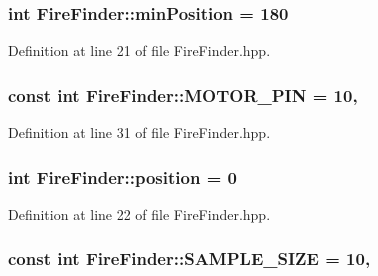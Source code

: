 \hypertarget{classFireFinder_ad8be0837d88f10d65b6f8a405f29494a}{
\subsubsection[{min\-Position}]{\setlength{\rightskip}{0pt plus 5cm}int Fire\-Finder\-::min\-Position = 180\hspace{0.3cm}{\ttfamily [private]}}}\label{classFireFinder_ad8be0837d88f10d65b6f8a405f29494a}


Definition at line 21 of file Fire\-Finder.\-hpp.

\hypertarget{classFireFinder_ac29b178da56a9347787371708bb62a20}{
\subsubsection[{M\-O\-T\-O\-R\-\_\-\-P\-I\-N}]{\setlength{\rightskip}{0pt plus 5cm}const int Fire\-Finder\-::\-M\-O\-T\-O\-R\-\_\-\-P\-I\-N = 10\hspace{0.3cm}{\ttfamily [static]}, {\ttfamily [private]}}}\label{classFireFinder_ac29b178da56a9347787371708bb62a20}


Definition at line 31 of file Fire\-Finder.\-hpp.

\hypertarget{classFireFinder_a40e204a2807939b3195024f14a9278fc}{
\subsubsection[{position}]{\setlength{\rightskip}{0pt plus 5cm}int Fire\-Finder\-::position = 0\hspace{0.3cm}{\ttfamily [private]}}}\label{classFireFinder_a40e204a2807939b3195024f14a9278fc}


Definition at line 22 of file Fire\-Finder.\-hpp.

\hypertarget{classFireFinder_a2136ca4e2438b84b0f4f3864697d51b1}{
\subsubsection[{S\-A\-M\-P\-L\-E\-\_\-\-S\-I\-Z\-E}]{\setlength{\rightskip}{0pt plus 5cm}const int Fire\-Finder\-::\-S\-A\-M\-P\-L\-E\-\_\-\-S\-I\-Z\-E = 10\hspace{0.3cm}{\ttfamily [static]}, {\ttfamily [private]}}}\label{classFireFinder_a2136ca4e2438b84b0f4f3864697d51b1}


